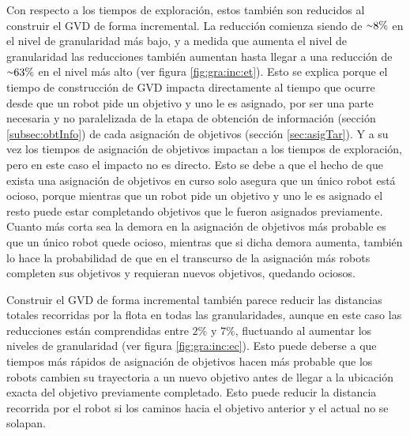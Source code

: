 Con respecto a los tiempos de exploración, estos también son reducidos al
construir el GVD de forma incremental. La reducción comienza siendo de
${\smallsim}8\%$ en el nivel de granularidad más bajo, y a medida que aumenta el
nivel de granularidad las reducciones también aumentan hasta llegar a una
reducción de ${\smallsim}63\%$ en el nivel más alto (ver figura \ref{fig:gra:inc:et}). Esto se explica porque el
tiempo de construcción de GVD impacta directamente al tiempo que ocurre desde
que un robot pide un objetivo y uno le es asignado, por ser una parte necesaria y
no paralelizada de la etapa de obtención de información (sección
\ref{subsec:obtInfo}) de cada asignación de objetivos (sección
\ref{sec:asigTar}). Y a su vez los tiempos de asignación de objetivos impactan
a los tiempos de exploración, pero en este caso el impacto no es directo. Esto
se debe a que el hecho de que exista una asignación de objetivos en curso solo
asegura que un único robot está ocioso, porque mientras que un robot pide un
objetivo y uno le es asignado el resto puede estar completando objetivos que le
fueron asignados previamente. Cuanto más corta sea la demora en la asignación
de objetivos más probable es que un único robot quede ocioso, mientras que si
dicha demora aumenta, también lo hace la probabilidad de que en el transcurso de
la asignación más robots completen sus objetivos y requieran nuevos objetivos,
quedando ociosos. 


Construir el GVD de forma incremental también parece reducir las distancias
totales recorridas por la flota en todas las granularidades, aunque en este
caso las reducciones están comprendidas entre $2\%$ y $7\%$, fluctuando al
aumentar los niveles de granularidad (ver figura \ref{fig:gra:inc:ec}). Esto puede deberse a que tiempos más
rápidos de asignación de objetivos hacen más probable que los robots cambien su
trayectoria a un nuevo objetivo antes de llegar a la ubicación exacta del
objetivo previamente completado. Esto puede reducir la distancia recorrida por
el robot si los caminos hacia el objetivo anterior y el actual no se solapan.


